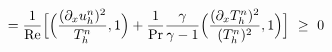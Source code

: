 \documentclass[preview]{standalone}
\newcommand{\dx}{\partial_x}
\begin{document}
\begin{align*}
\special{dvisvgm:raw <g id='unique000'>}=\frac{1}{\mathrm{Re}}\Big[\Big(\frac{(\dx u_h^n)^2}{T_h^n},1\Big)+\frac{1}{\mathrm{Pr}}\frac{\gamma}{\gamma-1}\Big(\frac{(\dx T_h^n)^2}{(T_h^n)^2},1\Big)\Big]\ \geq\ 0\special{dvisvgm:raw </g>}
\end{align*}
\end{document}
